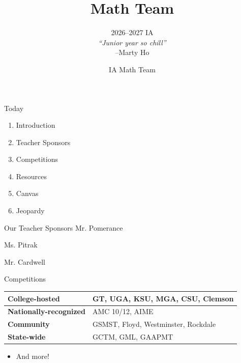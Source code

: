 \documentclass[aspectratio=169,xcolor=dvipsnames]{beamer}
\title[Math Team]{Math Team}
\subtitle{2026--2027 IA\\[0.8em]\textit{``Junior year so chill''}\\[-0.2em]{\scriptsize --Marty Ho}}
\author[IA Math Team]{IA Math Team}
\begin{document}
\begin{frame}[t]
  \titlepage
\end{frame}


\begin{frame}[t]{Today}
\vspace{0.35cm}
\begin{enumerate}
    \item Introduction
    \item Teacher Sponsors
    \item Competitions
    \item Resources
    \item Canvas
    \item Jeopardy
\end{enumerate}
\end{frame}


\begin{frame}[t]{Our Teacher Sponsors}
\vspace{0.8cm}
\centering
{\Large Mr. Pomerance}\par\vspace{0.55cm}
{\Large Ms. Pitrak}\par\vspace{0.55cm}
{\Large Mr. Cardwell}
\end{frame}


\begin{frame}[t]{Competitions}
\vspace{0.35cm}
\renewcommand{\arraystretch}{1.45}
\begin{tabular}{p{} p{}}
\toprule
\textbf{College-hosted} & GT, UGA, KSU, MGA, CSU, Clemson \\
\midrule
\textbf{Nationally-recognized} & AMC 10/12, AIME \\
\midrule
\textbf{Community} & GSMST, Floyd, Westminster, Rockdale \\
\midrule
\textbf{State-wide} & GCTM, GML, GAAPMT \\
\bottomrule
\end{tabular}
\vspace{4em}
\begin{itemize}
    \item And more!
\end{itemize}
\end{frame}
\end{document}
